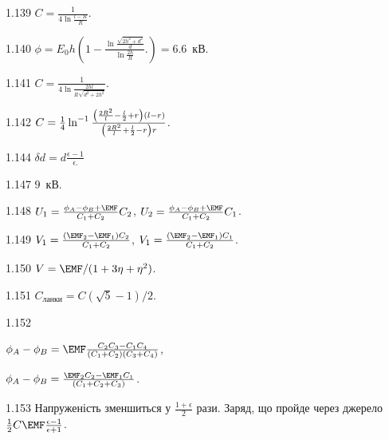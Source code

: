 \begin{Solution}{1.{139}}
	$C = \frac{1}{4\ln\frac{l - R}{R}}$.
\end{Solution}
\begin{Solution}{1.{140}}
	$\phi = E_0 h \left( 1 - \frac{\ln\frac{\sqrt{2h^2 + d^2}}{d}}{\ln\frac{2h}{R}}. \right) = 6.6$~кВ.
\end{Solution}
\begin{Solution}{1.{141}}
	$C = \frac{1}{4\ln\frac{2hl}{R\sqrt{d^2 + 2h^2}}}$.
\end{Solution}
\begin{Solution}{1.{142}}
	$C = \frac14\ln^{-1}%
		\frac{%
			\left( \frac{2R^2}{l} - \frac{l}{2} + r \right)(l - r)
		}%
		{\left( \frac{2R^2}{l} + \frac{l}{2} - r \right)r }$.
\end{Solution}
\begin{Solution}{1.{144}}
    $\delta d = d \frac{\epsilon - 1}{\epsilon.}$
\end{Solution}
\begin{Solution}{1.{147}}
	$9$~кВ.
\end{Solution}
\begin{Solution}{1.{148}}
	$U_1 = \frac{\phi_A - \phi_B + \EMF}{C_1 + C_2} C_2$,
	$U_2 = \frac{\phi_A - \phi_B + \EMF}{C_1 + C_2} C_1$.
\end{Solution}
\begin{Solution}{1.{149}}
	$V_1 = \frac{(\EMF_2 - \EMF_1) C_2}{C_1 + C_2}$, $V_1 = \frac{(\EMF_2 - \EMF_1) C_1}{C_1 + C_2}$.
\end{Solution}
\begin{Solution}{1.{150}}
	$V = \EMF/ (1 + 3\eta + \eta^2)$.
\end{Solution}
\begin{Solution}{1.{151}}
	$C_\text{ланки} = C \left( \sqrt5 -1 \right)/2$.
\end{Solution}
\begin{Solution}{1.{152}}
	\begin{enumerate*}[label=\alph*)]
		\item $\phi_A - \phi_B = \EMF\frac{C_2C_3 - C_1C_4}{\left( C_1 + C_2 \right)\left( C_3 + C_4 \right)}$,
		\item $\phi_A - \phi_B = \frac{\EMF_2C_2 - \EMF_1C_1}{\left( C_1 + C_2 + C_3 \right)}$.
	\end{enumerate*}
\end{Solution}
\begin{Solution}{1.{153}}
	Напруженість зменшиться у $\frac{1 + \epsilon}{2}$ рази. Заряд, що пройде через джерело $\frac12 C\EMF \frac{\epsilon - 1}{\epsilon  +1}$.
\end{Solution}
